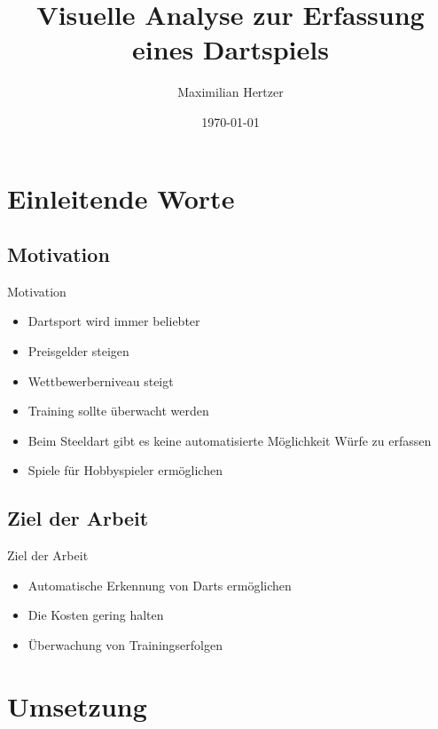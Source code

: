 \documentclass[aspectratio=169]{beamer}
\begin{document}
\title{Visuelle Analyse zur Erfassung eines Dartspiels}  
\author{Maximilian Hertzer}
\date{\today} 

\frame{\titlepage} 



\section{Einleitende Worte} 
\subsection{Motivation}
\begin{frame}{Motivation} 
\begin{itemize}
\item Dartsport wird immer beliebter \pause
\item Preisgelder steigen \pause
\item Wettbewerberniveau steigt \pause
\item Training sollte überwacht werden \pause
\item Beim Steeldart gibt es keine automatisierte Möglichkeit Würfe zu erfassen
\item Spiele für Hobbyspieler ermöglichen
\end{itemize} 
\end{frame}

\subsection{Ziel der Arbeit }
\begin{frame}{Ziel der Arbeit} 
\begin{itemize}
\item Automatische Erkennung von Darts ermöglichen 
\item Die Kosten gering halten 
\item Überwachung von Trainingserfolgen
\end{itemize} 
\end{frame}


\section{Umsetzung} 
\end{document}
